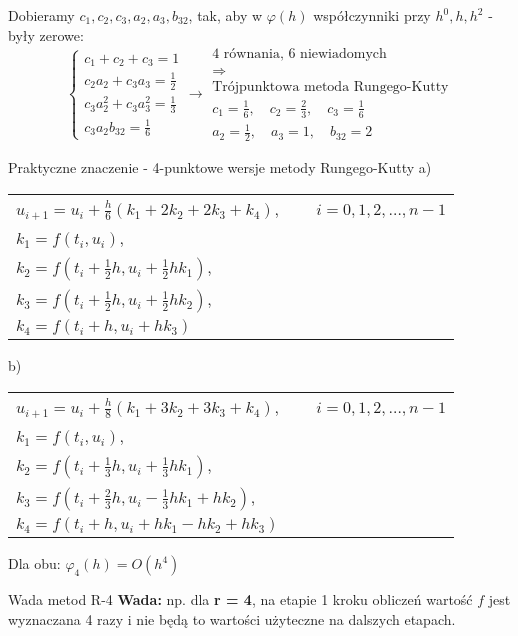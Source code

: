 \begin{frame}
    \begin{center}
    	Dobieramy $c_1,c_2,c_3,a_2,a_3,b_{32}$, tak, aby w $\varphi(h)$ współczynniki przy $h^0,h,h^2$ - były zerowe:
        $$\left\{\begin{array}{l}
        c_1+c_2+c_3 = 1\\
        c_2a_2+c_3a_3 = \frac{1}{2} \\
        c_3a_2^2+c_3a_3^2 = \frac{1}{3} \\
        c_3a_2b_{32} = \frac{1}{6}
        \end{array}\right.\rightarrow\left.\begin{array}{c}
        \text{4 równania, 6 niewiadomych}\\
        \Rightarrow \\
        \text{Trójpunktowa metoda Rungego-Kutty} \\
        c_1 = \frac{1}{6},\quad c_2 = \frac{2}{3}, \quad c_3 = \frac{1}{6} \\
        a_2 = \frac{1}{2},\quad a_3 = 1, \quad b_{32} = 2
        \end{array}\right.$$
    \end{center}
\end{frame}
\begin{frame}{Praktyczne znaczenie - 4-punktowe wersje metody Rungego-Kutty}
	a)
    \begin{center}
    	\begin{tabular}{l}
    		$u_{i+1} = u_i+\frac{h}{6}(k_1+2k_2+2k_3+k_4)$, $\qquad i = 0,1,2, \ldots,n-1$\\
            $k_1 = f(t_i,u_i)$,\\
            $k_2 = f(t_i+\frac{1}{2}h,u_i+\frac{1}{2}hk_1)$,\\
            $k_3 = f(t_i+\frac{1}{2}h,u_i+\frac{1}{2}hk_2)$,\\
            $k_4 = f(t_i+h,u_i+hk_3)$
    	\end{tabular}
    \end{center}
    b) 
      \begin{center}
    	\begin{tabular}{l}
    		$u_{i+1} = u_i+\frac{h}{8}(k_1+3k_2+3k_3+k_4)$, $\qquad i = 0,1,2, \ldots,n-1$\\
            $k_1 = f(t_i,u_i)$,\\
            $k_2 = f(t_i+\frac{1}{3}h,u_i+\frac{1}{3}hk_1)$,\\
            $k_3 = f(t_i+\frac{2}{3}h,u_i-\frac{1}{3}hk_1+hk_2)$,\\
            $k_4 = f(t_i+h,u_i+hk_1-hk_2+hk_3)$
    	\end{tabular}
    \end{center}
  	Dla obu: $\varphi_4(h) = O(h^4)$
\end{frame}
\begin{frame}{Wada metod R-4}
	\textbf{Wada:} \quad np. dla \textbf{r = 4}, na etapie 1 kroku obliczeń wartość $f$ jest wyznaczana 4 razy i nie będą to wartości użyteczne na dalszych etapach.\newline\par
\end{frame}
